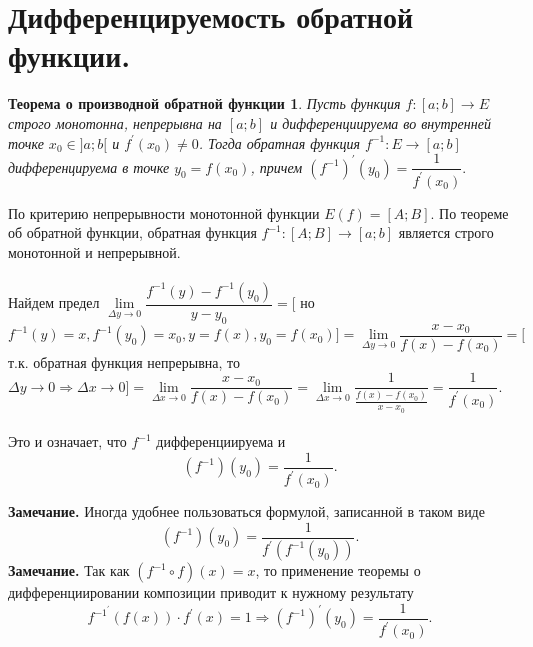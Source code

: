 \section{Дифференцируемость обратной функции.}
\newtheorem*{t1_1}{Теорема о производной обратной функции}
\begin{t1_1}
	Пусть функция $f : [a; b] \rightarrow E$ строго монотонна, непрерывна на $[a; b]$ и дифференциируема во внутренней точке $x_0 \in ]a ; b[$ и $f^\prime{(x_0)} \not= 0$.
	Тогда обратная функция $f^{-1} : E \rightarrow [a; b]$ дифференцируема в точке $y_0 = f(x_0)$, причем $(f^{-1})^\prime(y_0) = \dfrac{1}{f^{\prime}(x_0)}.$
\end{t1_1}
\begin{Proof}
	По критерию непрерывности монотонной функции $E(f) = [A; B]$. По теореме об обратной функции, обратная функция $f^{-1} : [A; B] \rightarrow [a; b]$ является строго монотонной и непрерывной.
	\\\\
	Найдем предел $\lim\limits_{\Delta{y} \to 0} \dfrac{f^{-1}(y) - f^{-1}(y_0)}{y - y_0} = [$ но $f^{-1}(y) = x, f^{-1}(y_0) = x_0, y = f(x), y_0 = f(x_0) ] = \lim\limits_{\Delta{y} \to 0} \dfrac{x - x_0}{f(x) - f(x_0)} = [$ т.к. обратная функция непрерывна, то $\Delta{y} \rightarrow 0 \Rightarrow \Delta{x} \rightarrow 0 ] = \lim\limits_{\Delta{x} \rightarrow 0} \dfrac{x - x_0}{f(x) - f(x_0)} = \lim\limits_{\Delta{x} \rightarrow 0} \dfrac{1}{\frac{f(x) - f(x_0)}{x - x_0}} = \dfrac{1}{f^\prime(x_0)}.$\\\\
	Это и означает, что $f^{-1}$ дифференциируема и $$(f^{-1})(y_0) = \frac{1}{f^\prime(x_0)}.$$
\end{Proof}
\textbf{Замечание.} Иногда удобнее пользоваться формулой, записанной в таком виде
$$(f^{-1})(y_0) = \frac{1}{f^\prime(f^{-1}(y_0))}.$$
\textbf{Замечание.} Так как $(f^{-1} \circ  f)(x) = x$, то применение теоремы о дифференциировании композиции приводит к нужному результату $$f^{{-1}^\prime}(f(x)) \cdot f^\prime(x) = 1 \Rightarrow (f^{-1})^\prime(y_0) = \frac{1}{f^\prime(x_0)}.$$

